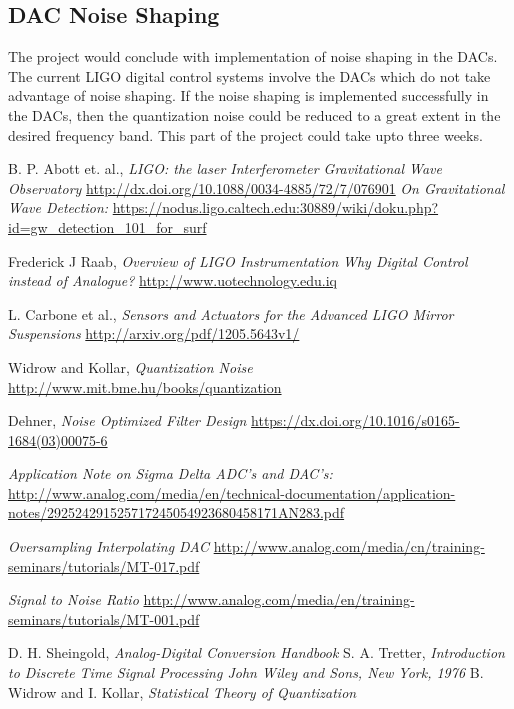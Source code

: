 \documentclass[colorlinks=true,pdfstartview=FitV,linkcolor=blue,
            citecolor=red,urlcolor=magenta]{ligodoc}
\begin{document}
\subsection{DAC Noise Shaping}The project would conclude with implementation of noise shaping in the DACs. The current LIGO digital control systems involve the DACs which do not take advantage of noise shaping. If the noise shaping is implemented successfully in the DACs, then the quantization noise could be reduced to a great extent in the desired frequency band. This part of the project could take upto three weeks.


\begin{thebibliography}{13}  
 B. P. Abott et. al.,  
				\emph{LIGO: the laser Interferometer Gravitational Wave Observatory} 							\url{http://dx.doi.org/10.1088/0034-4885/72/7/076901}
 \emph{On Gravitational Wave Detection: }
			\url{https://nodus.ligo.caltech.edu:30889/wiki/doku.php?id=gw_detection_101_for_surf}

 Frederick J Raab, \emph{Overview of LIGO Instrumentation}
 \emph{Why Digital Control instead of Analogue?} 												\url{http://www.uotechnology.edu.iq}

 L. Carbone et al., \emph{Sensors and Actuators for the Advanced LIGO Mirror Suspensions}
									\url{http://arxiv.org/pdf/1205.5643v1/}
									
 Widrow and Kollar, \emph{Quantization Noise} 				\url{http://www.mit.bme.hu/books/quantization}

 Dehner, \emph{Noise Optimized Filter Design} 		\url{https://dx.doi.org/10.1016/s0165-1684(03)00075-6}

 \emph{Application Note on Sigma Delta ADC's and DAC's:} \url{http://www.analog.com/media/en/technical-documentation/application-notes/292524291525717245054923680458171AN283.pdf}

\emph{Oversampling Interpolating DAC}	\url{http://www.analog.com/media/cn/training-seminars/tutorials/MT-017.pdf}

 \emph{Signal to Noise Ratio} 
				\url{http://www.analog.com/media/en/training-seminars/tutorials/MT-001.pdf}
				
 D. H. Sheingold, \emph{Analog-Digital Conversion Handbook}
 S. A. Tretter, \emph{Introduction to Discrete Time Signal Processing John Wiley and Sons, New York, 1976}
 B. Widrow and I. Kollar, \emph{Statistical Theory of Quantization}


\end{thebibliography}        
\end{document}
